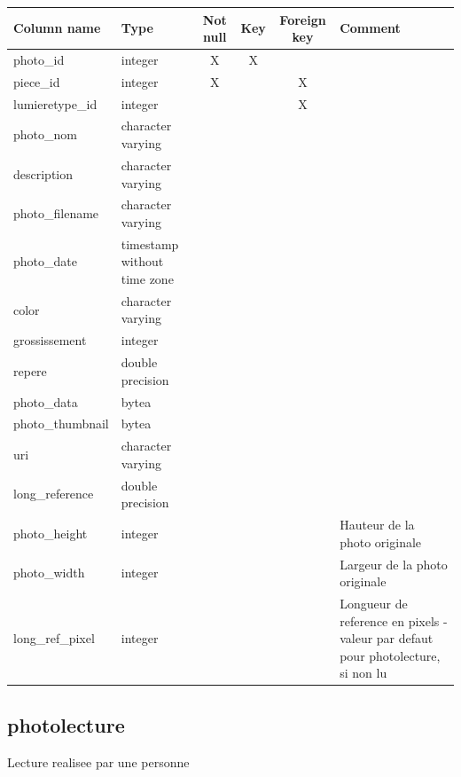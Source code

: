 \begin{tabular}{|l| p{2cm}|c|c|c| p{3cm}|}
\hline
Column name & Type & Not null & Key & Foreign key & Comment \\
\hline
photo\_id & integer & X & X & & \\
\hline
piece\_id & integer & X & & X & \\
\hline
lumieretype\_id & integer & & & X & \\
\hline
photo\_nom & character varying & & & & \\
\hline
description & character varying & & & & \\
\hline
photo\_filename & character varying & & & & \\
\hline
photo\_date & timestamp without time zone & & & & \\
\hline
color & character varying & & & & \\
\hline
grossissement & integer & & & & \\
\hline
repere & double precision & & & & \\
\hline
photo\_data & bytea & & & & \\
\hline
photo\_thumbnail & bytea & & & & \\
\hline
uri & character varying & & & & \\
\hline
long\_reference & double precision & & & & \\
\hline
photo\_height & integer & & & & Hauteur de la photo originale\\
\hline
photo\_width & integer & & & & Largeur de la photo originale\\
\hline
long\_ref\_pixel & integer & & & & Longueur de reference en pixels - valeur par defaut pour photolecture, si non lu\\
\hline
\end{tabular}
\subsection{photolecture}
Lecture realisee par une personne

